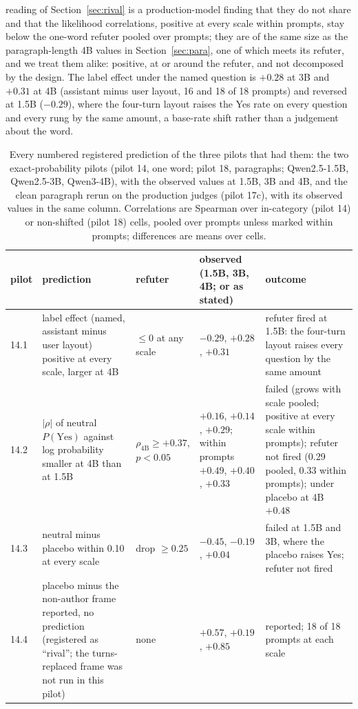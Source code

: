 \documentclass[twocolumn,10pt]{article}
\newcommand{\pyes}{P(\mathrm{Yes})}
\begin{document}
reading of Section~\ref{sec:rival} is a production-model finding that they do not share and that the likelihood correlations, positive at every scale within prompts, stay below the one-word refuter pooled over prompts; they are of the same size as the paragraph-length 4B values in Section~\ref{sec:para}, one of which meets its refuter, and we treat them alike: positive, at or around the refuter, and not decomposed by the design. The label effect under the named question is $+0.28$ at 3B and $+0.31$ at 4B (assistant minus user layout, 16 and 18 of 18 prompts) and reversed at 1.5B ($-0.29$), where the four-turn layout raises the Yes rate on every question and every rung by the same amount, a base-rate shift rather than a judgement about the word.

\begin{table}[t]
\centering\small
\caption{Every numbered registered prediction of the three pilots that had them: the two exact-probability pilots (pilot 14, one word; pilot 18, paragraphs; Qwen2.5-1.5B, Qwen2.5-3B, Qwen3-4B), with the observed values at 1.5B, 3B and 4B, and the clean paragraph rerun on the production judges (pilot 17c), with its observed values in the same column. Correlations are Spearman over in-category (pilot 14) or non-shifted (pilot 18) cells, pooled over prompts unless marked within prompts; differences are means over cells.}
\label{tab:preds}\footnotesize\setlength{\tabcolsep}{4pt}
\begin{tabular}{p{0.9cm}p{4.3cm}p{2.6cm}p{3.3cm}p{5.2cm}}
\toprule
pilot & prediction & refuter & observed (1.5B, 3B, 4B; or as stated) & outcome \\
\midrule
14.1 & label effect (named, assistant minus user layout) positive at every scale, larger at 4B & $\le 0$ at any scale & $-0.29$, $+0.28$, $+0.31$ & refuter fired at 1.5B: the four-turn layout raises every question by the same amount \\
14.2 & $|\rho|$ of neutral $\pyes$ against log probability smaller at 4B than at 1.5B & $\rho_{4\mathrm{B}} \ge +0.37$, $p<0.05$ & $+0.16$, $+0.14$, $+0.29$; within prompts $+0.49$, $+0.40$, $+0.33$ & failed (grows with scale pooled; positive at every scale within prompts); refuter not fired (0.29 pooled, 0.33 within prompts); under placebo at 4B $+0.48$ \\
14.3 & neutral minus placebo within 0.10 at every scale & drop $\ge 0.25$ & $-0.45$, $-0.19$, $+0.04$ & failed at 1.5B and 3B, where the placebo raises Yes; refuter not fired \\
14.4 & placebo minus the non-author frame reported, no prediction (registered as ``rival''; the turns-replaced frame was not run in this pilot) & none & $+0.57$, $+0.19$, $+0.85$ & reported; 18 of 18 prompts at each scale \\

\end{tabular}
\end{table}
\end{document}
